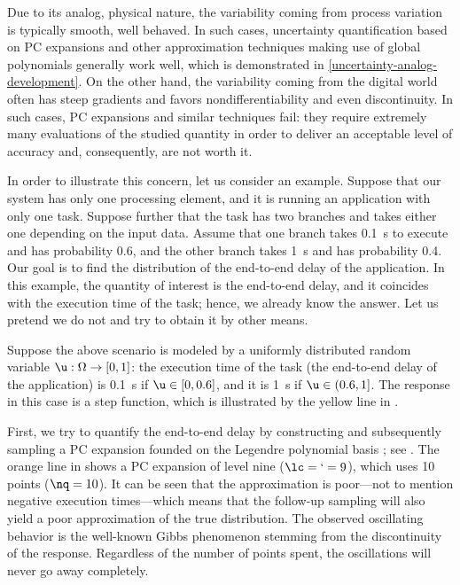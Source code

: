 Due to its analog, physical nature, the variability coming from process
variation is typically smooth, well behaved. In such cases, uncertainty
quantification based on \ac{PC} expansions \cite{xiu2010} and other
approximation techniques making use of global polynomials generally work well,
which is demonstrated in \cref{uncertainty-analog-development}. On the other
hand, the variability coming from the digital world often has steep gradients
and favors nondifferentiability and even discontinuity. In such cases, \ac{PC}
expansions and similar techniques fail: they require extremely many evaluations
of the studied quantity in order to deliver an acceptable level of accuracy and,
consequently, are not worth it.

In order to illustrate this concern, let us consider an example. Suppose that
our system has only one processing element, and it is running an application
with only one task. Suppose further that the task has two branches and takes
either one depending on the input data. Assume that one branch takes 0.1~s to
execute and has probability 0.6, and the other branch takes 1~s and has
probability 0.4. Our goal is to find the distribution of the end-to-end delay of
the application. In this example, the quantity of interest is the end-to-end
delay, and it coincides with the execution time of the task; hence, we already
know the answer. Let us pretend we do not and try to obtain it by other means.

Suppose the above scenario is modeled by a uniformly distributed random variable
$\u: \Omega \to [0, 1]$: the execution time of the task (the end-to-end delay of
the application) is 0.1~s if $\u \in [0, 0.6]$, and it is 1~s if $\u \in (0.6,
1]$. The response in this case is a step function, which is illustrated by the
yellow line in .

First, we try to quantify the end-to-end delay by constructing and subsequently
sampling a \ac{PC} expansion founded on the Legendre polynomial basis
\cite{xiu2010}; see . The orange line in
 shows a \ac{PC} expansion of level nine ($\lc = \lq =
9$), which uses 10 points ($\nq = 10$). It can be seen that the approximation is
poor---not to mention negative execution times---which means that the follow-up
sampling will also yield a poor approximation of the true distribution. The
observed oscillating behavior is the well-known Gibbs phenomenon stemming from
the discontinuity of the response. Regardless of the number of points spent, the
oscillations will never go away completely.

